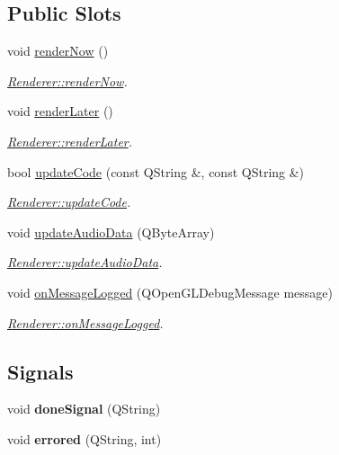 \subsection*{Public Slots}
\begin{DoxyCompactItemize}
\item 
void \hyperlink{classRenderer_aff000964f75549d4f0089b0d7f914d4e}{render\+Now} ()
\begin{DoxyCompactList}\small\item\em \hyperlink{classRenderer_aff000964f75549d4f0089b0d7f914d4e}{Renderer\+::render\+Now}. \end{DoxyCompactList}\item 
void \hyperlink{classRenderer_a7a56362ec6a3e9e17f217668152a7252}{render\+Later} ()
\begin{DoxyCompactList}\small\item\em \hyperlink{classRenderer_a7a56362ec6a3e9e17f217668152a7252}{Renderer\+::render\+Later}. \end{DoxyCompactList}\item 
bool \hyperlink{classRenderer_ada11b323b6e47935245a4ffc3c2f34eb}{update\+Code} (const Q\+String \&, const Q\+String \&)
\begin{DoxyCompactList}\small\item\em \hyperlink{classRenderer_ada11b323b6e47935245a4ffc3c2f34eb}{Renderer\+::update\+Code}. \end{DoxyCompactList}\item 
void \hyperlink{classRenderer_a941e09f5b257fcf3a90e0a19b61096b4}{update\+Audio\+Data} (Q\+Byte\+Array)
\begin{DoxyCompactList}\small\item\em \hyperlink{classRenderer_a941e09f5b257fcf3a90e0a19b61096b4}{Renderer\+::update\+Audio\+Data}. \end{DoxyCompactList}\item 
void \hyperlink{classRenderer_acf65d29d7d1a3062a3d4bdb9e028fb23}{on\+Message\+Logged} (Q\+Open\+G\+L\+Debug\+Message message)
\begin{DoxyCompactList}\small\item\em \hyperlink{classRenderer_acf65d29d7d1a3062a3d4bdb9e028fb23}{Renderer\+::on\+Message\+Logged}. \end{DoxyCompactList}\end{DoxyCompactItemize}
\subsection*{Signals}
\begin{DoxyCompactItemize}
\item 
\hypertarget{classRenderer_a14700ec0055b02afe599c38fbb9fcaaf}{void {\bfseries done\+Signal} (Q\+String)}\label{classRenderer_a14700ec0055b02afe599c38fbb9fcaaf}

\item 
\hypertarget{classRenderer_a20f6d728a4c5edb06dcadef1b77e5ad4}{void {\bfseries errored} (Q\+String, int)}\label{classRenderer_a20f6d728a4c5edb06dcadef1b77e5ad4}

\end{DoxyCompactItemize}
